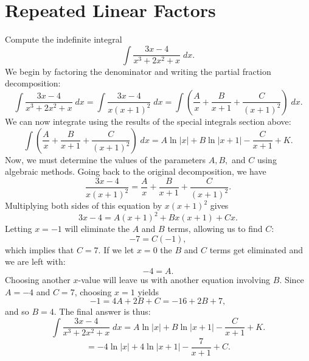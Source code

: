 \documentclass[handout]{ximera}
\begin{document}
\section{Repeated Linear Factors}


\begin{example}[example 6]
Compute the indefinite integral
\[
\int \frac{3x - 4}{x^3 + 2x^2 + x} \; dx.
\]
We begin by factoring the denominator and writing the partial fraction decomposition:
\[
\int \frac{3x - 4}{x^3 + 2x^2 + x} \; dx = \int \frac{3x - 4}{x(x+1)^2} \; dx = \int \left(\frac{A}{x} + \frac{B}{x+1} + \frac{C}{(x+1)^2} \right) \; dx.
\]
We can now integrate using the results of the special integrals section above:
\[
\int \left(\frac{A}{x} + \frac{B}{x+1} + \frac{C}{(x+1)^2} \right) \; dx = A\ln|x| + B\ln|x+1| - \frac{C}{x+1} + K.
\]
Now, we must determine the values of the parameters $A, B, $ and $C$ using algebraic methods.
Going back to the original decomposition, we have
\[
\frac{3x - 4}{x(x+1)^2} = \frac{A}{x} + \frac{B}{x+1} + \frac{C}{(x+1)^2}.
\]
Multiplying both sides of this equation by $x(x+1)^2$ gives
\[
3x-4 = A(x+1)^2 + Bx(x+1) + Cx.
\]
Letting $x = -1$ will eliminate the $A$ and $B$ terms, allowing us to find $C$:
\[
-7 = C(-1),
\]
which implies that $C = 7$.  If we let $x = 0$ the $B$ and $C$ terms get eliminated and we are left with:
\[
-4 = A .
\]
Choosing another $x$-value will leave us with another equation involving $B$.  Since $A = -4$ and $C = 7$, choosing $x = 1$ yields
\[
-1 = 4A + 2B + C = -16 + 2B + 7,
\]
and so $B = 4$.
The final answer is thus:
\[
\int \frac{3x - 4}{x^3 + 2x^2 + x} \; dx = A\ln|x| + B\ln|x+1| - \frac{C}{x+1} + K.
\]
\[
= -4\ln|x| +4\ln|x+1| - \frac{7}{x+1} + C.
\]

\end{example}



\begin{center}
\begin{foldable}
\end{foldable}
\end{center}
\end{document}

